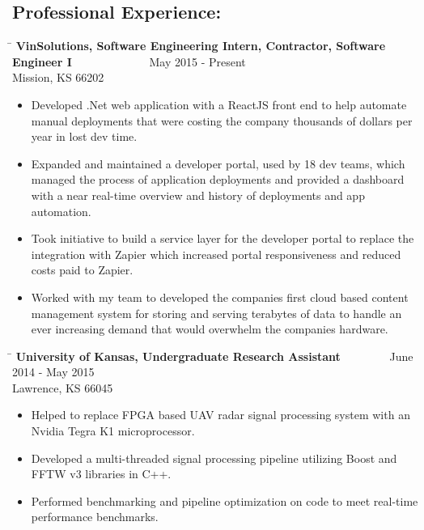 \documentclass{res}
\begin{document}
\begin{resume}
\section{Professional Experience:}
   \vspace{-0.1in}	
   \begin{tabbing}
   \hspace{5.5in}\= \kill 
    {\bf VinSolutions, Software Engineering Intern, Contractor, Software Engineer I} \>~~~~~~~~~~~~~May 2015 - Present\\
    Mission, KS 66202
   \end{tabbing}\vspace{-10pt}
	\begin{itemize}
		\item Developed .Net web application with a ReactJS front end to help automate manual deployments that were costing the company thousands of dollars per year in lost dev time.
		\item Expanded and maintained a developer portal, used by 18 dev teams, which managed the process of application deployments and provided a dashboard with a near real-time overview and history of deployments and app automation.
		\item Took initiative to build a service layer for the developer portal to replace the integration with Zapier which increased portal responsiveness and reduced costs paid to Zapier.
		\item Worked with my team to developed the companies first cloud based content management system for storing and serving terabytes of data to handle an ever increasing demand that would overwhelm the companies hardware. \vspace{-15pt}
	\end{itemize}
   \begin{tabbing}
   \hspace{5.5in}\= \kill
    {\bf University of Kansas, Undergraduate Research Assistant} \>~~~~~~~~June 2014 - May 2015\\
    Lawrence, KS 66045
   \end{tabbing}\vspace{-10pt}
	\begin{itemize}
		\item Helped to replace FPGA based UAV radar signal processing system with an Nvidia Tegra K1 microprocessor.
		\item Developed a multi-threaded signal processing pipeline utilizing Boost and FFTW v3 libraries in C++.
		\item Performed benchmarking and pipeline optimization on code to meet real-time performance benchmarks.\vspace{-15pt}

\end{itemize}
\end{resume}
\end{document}
